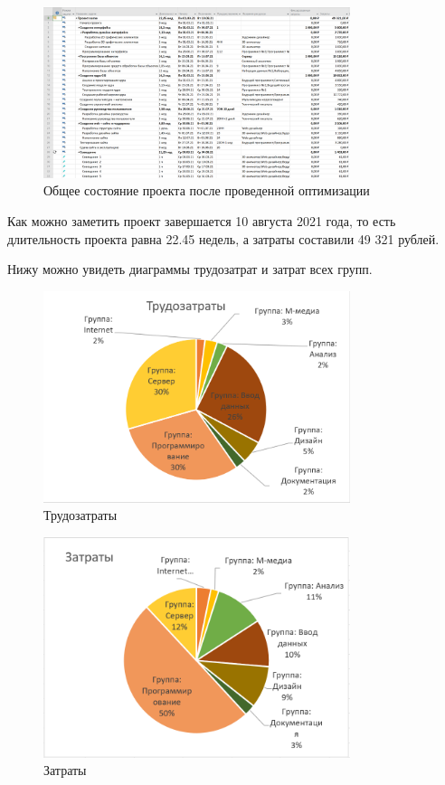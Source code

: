 \begin{figure}[H]
    \centering
    \includegraphics[width=0.8\textwidth]{img/content/task_3.png}
    \caption{Общее состояние проекта после проведенной оптимизации}
    \label{fig:task_3}
\end{figure}

Как можно заметить проект завершается 10 августа 2021 года, то есть длительность проекта равна 22.45 недель, а затраты составили 49 321 рублей.

Нижу можно увидеть диаграммы трудозатрат и затрат всех групп.

\begin{figure}[H]
    \centering
    \includegraphics[width=0.8\textwidth]{img/content/diagram_hours.png}
    \caption{Трудозатраты}
    \label{fig:diagram_hours}
\end{figure}

\begin{figure}[H]
    \centering
    \includegraphics[width=0.8\textwidth]{img/content/diagram_money.png}
    \caption{Затраты}
    \label{fig:diagram_money}
\end{figure}

